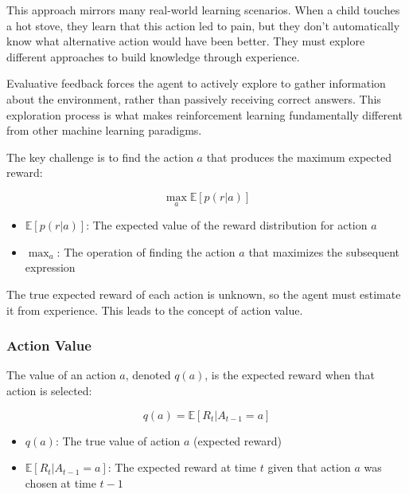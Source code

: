 \documentclass{article}
\begin{document}
This approach mirrors many real-world learning scenarios. When a child touches a hot stove, they learn that this action led to pain, but they don't automatically know what alternative action would have been better. They must explore different approaches to build knowledge through experience.

Evaluative feedback forces the agent to actively explore to gather information about the environment, rather than passively receiving correct answers. This exploration process is what makes reinforcement learning fundamentally different from other machine learning paradigms.

The key challenge is to find the action $a$ that produces the maximum expected reward:

\begin{equation}
    \max_a \mathbb{E}[p(r|a)]
\end{equation}

\begin{tcolorbox}[colback=blue!5!white,colframe=blue!75!black,title=Notation Overview]
\begin{itemize}
    \item $\mathbb{E}[p(r|a)]$: The expected value of the reward distribution for action $a$
    \item $\max_a$: The operation of finding the action $a$ that maximizes the subsequent expression
\end{itemize}
\end{tcolorbox}

The true expected reward of each action is unknown, so the agent must estimate it from experience. This leads to the concept of action value.

\subsubsection{Action Value}
The value of an action $a$, denoted $q(a)$, is the expected reward when that action is selected:

\begin{equation}
    q(a) = \mathbb{E}[R_t | A_{t-1} = a]
\end{equation}

\begin{tcolorbox}[colback=blue!5!white,colframe=blue!75!black,title=Notation Overview]
\begin{itemize}
    \item $q(a)$: The true value of action $a$ (expected reward)
    \item $\mathbb{E}[R_t | A_{t-1} = a]$: The expected reward at time $t$ given that action $a$ was chosen at time $t-1$
\end{itemize}
\end{tcolorbox}
\end{document}
